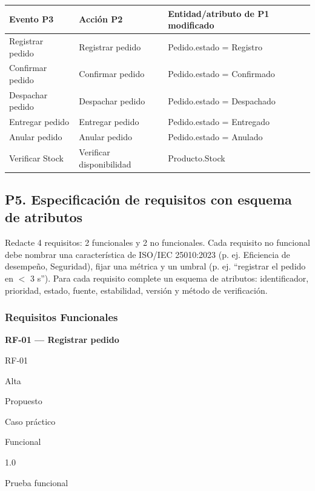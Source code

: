 \documentclass[11pt,a4paper]{article}
\newenvironment{requisito}[1]{%
  \par\noindent\textbf{#1}\par\smallskip
  \begin{description}[leftmargin=0pt,style=sameline,itemsep=1pt]
}{%
  \end{description}\bigskip
}
\begin{document}
\begin{center}
\begin{tabular}{|p{4cm}|p{4cm}|p{5cm}|}
\hline
\rowcolor{tablehead}
\textbf{Evento P3} & \textbf{Acción P2} & \textbf{Entidad/atributo de P1 modificado} \\
\hline
Registrar pedido & Registrar pedido & Pedido.estado = Registro \\
\hline
Confirmar pedido & Confirmar pedido & Pedido.estado = Confirmado \\
\hline
Despachar pedido & Despachar pedido & Pedido.estado = Despachado \\
\hline
Entregar pedido & Entregar pedido & Pedido.estado = Entregado \\
\hline
Anular pedido & Anular pedido & Pedido.estado = Anulado \\
\hline
Verificar Stock & Verificar disponibilidad & Producto.Stock \\
\hline
\end{tabular}
\end{center}

\subsection*{P5. Especificación de requisitos con esquema de atributos}

Redacte 4 requisitos: 2 funcionales y 2 no funcionales. Cada requisito no funcional debe nombrar
una característica de ISO/IEC 25010:2023 (p. ej. Eficiencia de desempeño, Seguridad), fijar una
métrica y un umbral (p. ej. ``registrar el pedido en $<$ 3 s''). Para cada requisito complete un
esquema de atributos: identificador, prioridad, estado, fuente, estabilidad, versión y método de
verificación.

\subsubsection*{Requisitos Funcionales}

\begin{requisito}{RF-01 --- Registrar pedido}
  \item[Identificador:] RF-01
  \item[Prioridad:] Alta
  \item[Estado:] Propuesto
  \item[Fuente:] Caso práctico
  \item[Estabilidad:] Funcional
  \item[Versión:] 1.0
  \item[Método de verificación:] Prueba funcional
\end{requisito}
\end{document}
